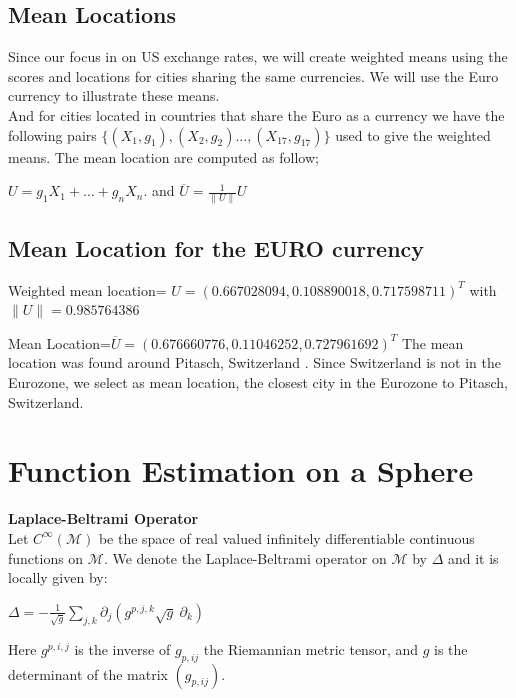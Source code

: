 \documentclass[a0,landscape]{a0poster}
\begin{document}
\begin{multicols}{4}
\subsection*{\color{blue} Mean Locations}
{\small Since our focus in on US exchange rates, we will create weighted means using the scores and locations for cities sharing the same currencies. We will use the Euro currency to illustrate these means.\\
 And for cities located in countries that share the Euro as a currency we have the following pairs $\{  (X_1, g_1), (X_2, g_2)..., (X_{17}, g_{17})\}$ used to give the weighted means. The mean location are computed as follow;}
\begin{center}
 $U = g_1 X_1 + ...+ g_n X_n. $  and $\overline{U}= \frac{1}{\|U\|}U$
\end{center}


\subsection*{\color{blue} Mean Location for the EURO currency}

Weighted mean location= $U=(0.667028094,	0.108890018	,0.717598711)^{T}$
with $\|U\|=0.985764386$

Mean Location=$\overline{U}=(0.676660776,	0.11046252,0.727961692
)^{T}$
The mean location was found around Pitasch, Switzerland . Since Switzerland is not in the Eurozone, we select as mean location, the closest city in the Eurozone to Pitasch, Switzerland. \\
\begin{center}
\end{center}



\section*{\color{red}Function Estimation on a Sphere}

\noindent \textbullet \textbf{Laplace-Beltrami Operator}\\
Let $C^{\infty}(\mathcal{M})$ be the space of real valued infinitely differentiable continuous functions on $\mathcal{M}$. We denote the Laplace-Beltrami operator on $\mathcal{M}$ by $\Delta$ and it is locally given by:
\begin{center}
$\Delta  = - \frac{1}{\sqrt{g}} \sum_{j,k} \partial_j \left( g^{p,j,k} \sqrt{g} ~\partial_k \right)$
\end{center}
Here $g^{p,i,j}$ is the inverse of $g_{p,ij}$ the Riemannian metric tensor, and $g$ is the determinant of the matrix $(g_{p,ij})$.\\


\end{multicols}
\end{document}
